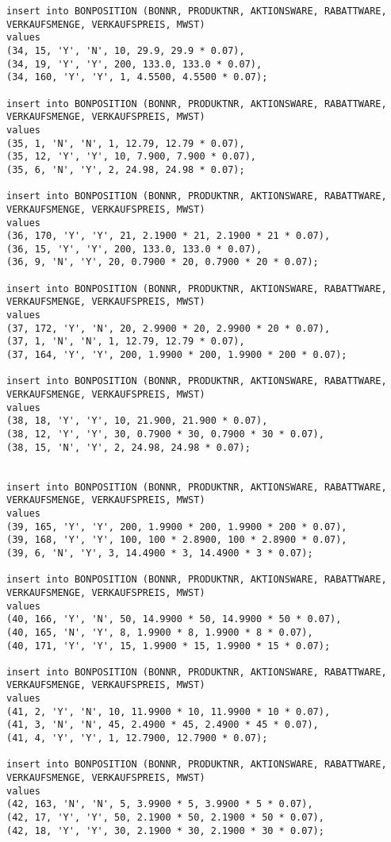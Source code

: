 \begin{lstlisting}
insert into BONPOSITION (BONNR, PRODUKTNR, AKTIONSWARE, RABATTWARE, VERKAUFSMENGE, VERKAUFSPREIS, MWST)
values
(34, 15, 'Y', 'N', 10, 29.9, 29.9 * 0.07),
(34, 19, 'Y', 'Y', 200, 133.0, 133.0 * 0.07),
(34, 160, 'Y', 'Y', 1, 4.5500, 4.5500 * 0.07);

insert into BONPOSITION (BONNR, PRODUKTNR, AKTIONSWARE, RABATTWARE, VERKAUFSMENGE, VERKAUFSPREIS, MWST)
values
(35, 1, 'N', 'N', 1, 12.79, 12.79 * 0.07),
(35, 12, 'Y', 'Y', 10, 7.900, 7.900 * 0.07),
(35, 6, 'N', 'Y', 2, 24.98, 24.98 * 0.07);

insert into BONPOSITION (BONNR, PRODUKTNR, AKTIONSWARE, RABATTWARE, VERKAUFSMENGE, VERKAUFSPREIS, MWST)
values
(36, 170, 'Y', 'Y', 21, 2.1900 * 21, 2.1900 * 21 * 0.07),
(36, 15, 'Y', 'Y', 200, 133.0, 133.0 * 0.07),
(36, 9, 'N', 'Y', 20, 0.7900 * 20, 0.7900 * 20 * 0.07);

insert into BONPOSITION (BONNR, PRODUKTNR, AKTIONSWARE, RABATTWARE, VERKAUFSMENGE, VERKAUFSPREIS, MWST)
values
(37, 172, 'Y', 'N', 20, 2.9900 * 20, 2.9900 * 20 * 0.07),
(37, 1, 'N', 'N', 1, 12.79, 12.79 * 0.07),
(37, 164, 'Y', 'Y', 200, 1.9900 * 200, 1.9900 * 200 * 0.07);

insert into BONPOSITION (BONNR, PRODUKTNR, AKTIONSWARE, RABATTWARE, VERKAUFSMENGE, VERKAUFSPREIS, MWST)
values
(38, 18, 'Y', 'Y', 10, 21.900, 21.900 * 0.07),
(38, 12, 'Y', 'Y', 30, 0.7900 * 30, 0.7900 * 30 * 0.07),
(38, 15, 'N', 'Y', 2, 24.98, 24.98 * 0.07);


insert into BONPOSITION (BONNR, PRODUKTNR, AKTIONSWARE, RABATTWARE, VERKAUFSMENGE, VERKAUFSPREIS, MWST)
values
(39, 165, 'Y', 'Y', 200, 1.9900 * 200, 1.9900 * 200 * 0.07),
(39, 168, 'Y', 'Y', 100, 100 * 2.8900, 100 * 2.8900 * 0.07),
(39, 6, 'N', 'Y', 3, 14.4900 * 3, 14.4900 * 3 * 0.07);

insert into BONPOSITION (BONNR, PRODUKTNR, AKTIONSWARE, RABATTWARE, VERKAUFSMENGE, VERKAUFSPREIS, MWST)
values
(40, 166, 'Y', 'N', 50, 14.9900 * 50, 14.9900 * 50 * 0.07),
(40, 165, 'N', 'Y', 8, 1.9900 * 8, 1.9900 * 8 * 0.07),
(40, 171, 'Y', 'Y', 15, 1.9900 * 15, 1.9900 * 15 * 0.07);

insert into BONPOSITION (BONNR, PRODUKTNR, AKTIONSWARE, RABATTWARE, VERKAUFSMENGE, VERKAUFSPREIS, MWST)
values
(41, 2, 'Y', 'N', 10, 11.9900 * 10, 11.9900 * 10 * 0.07),
(41, 3, 'N', 'N', 45, 2.4900 * 45, 2.4900 * 45 * 0.07),
(41, 4, 'Y', 'Y', 1, 12.7900, 12.7900 * 0.07);

insert into BONPOSITION (BONNR, PRODUKTNR, AKTIONSWARE, RABATTWARE, VERKAUFSMENGE, VERKAUFSPREIS, MWST)
values
(42, 163, 'N', 'N', 5, 3.9900 * 5, 3.9900 * 5 * 0.07),
(42, 17, 'Y', 'Y', 50, 2.1900 * 50, 2.1900 * 50 * 0.07),
(42, 18, 'Y', 'Y', 30, 2.1900 * 30, 2.1900 * 30 * 0.07);


\end{lstlisting}
